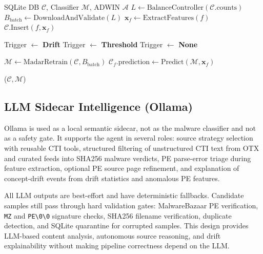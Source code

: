 \documentclass[letterpaper,10pt,conference]{ieeeconf}
\begin{document}
\begin{algorithm}[htbp]
\caption{AMD-Agent Core Control Loop}
\label{alg:core_loop}
\small
\begin{algorithmic}[1]
\REQUIRE SQLite DB $\mathcal{C}$, Classifier $\mathcal{M}$, ADWIN $\mathcal{A}$
\LOOP
    \STATE $L \gets \text{BalanceController}(\mathcal{C}.\text{counts})$ 
    \STATE $B_{\text{batch}} \gets \text{DownloadAndValidate}(L)$
        \STATE $\mathbf{x}_f \gets \text{ExtractFeatures}(f)$
        \STATE $\mathcal{C}.\text{Insert}(f, \mathbf{x}_f)$
    \ENDFOR
    
        \STATE Trigger $\leftarrow$ \textbf{Drift}
        \STATE Trigger $\leftarrow$ \textbf{Threshold}
    \ELSE
        \STATE Trigger $\leftarrow$ \textbf{None}
    \ENDIF
    
        \STATE $\mathcal{M} \gets \text{MadarRetrain}(\mathcal{C}, B_{\text{batch}})$
    \ELSE
            \STATE $\mathcal{C}_f.\text{prediction} \gets \text{Predict}(\mathcal{M}, \mathbf{x}_f)$
        \ENDFOR
    \ENDIF
    
        \STATE {}($\mathcal{C}, \mathcal{M}$)
    \ENDIF
\ENDLOOP
\end{algorithmic}
\end{algorithm}

\subsection{LLM Sidecar Intelligence (Ollama)}
Ollama is used as a local semantic sidecar, not as the malware classifier and not as a safety gate. It supports the agent in several roles: source strategy selection with reusable CTI tools, structured filtering of unstructured CTI text from OTX and curated feeds into SHA256 malware verdicts, PE parse-error triage during feature extraction, optional PE source page refinement, and explanation of concept-drift events from drift statistics and anomalous PE features.

All LLM outputs are best-effort and have deterministic fallbacks. Candidate samples still pass through hard validation gates: MalwareBazaar PE verification, \texttt{MZ} and \texttt{PE\textbackslash0\textbackslash0} signature checks, SHA256 filename verification, duplicate detection, and SQLite quarantine for corrupted samples. This design provides LLM-based content analysis, autonomous source reasoning, and drift explainability without making pipeline correctness depend on the LLM.
\end{document}
